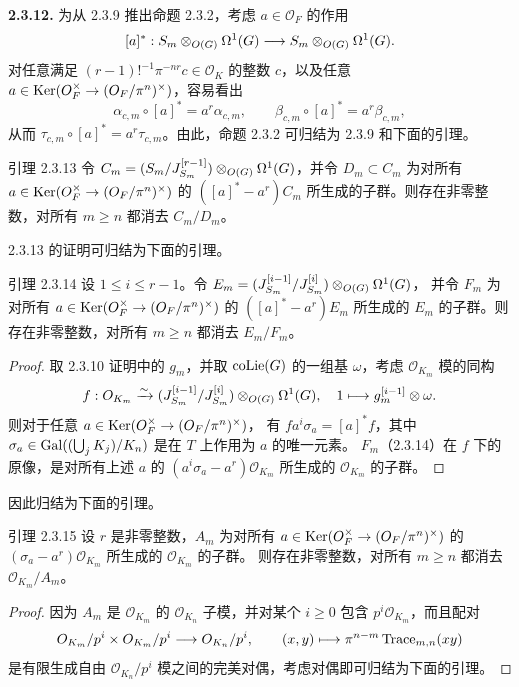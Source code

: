 \noindent\textbf{2.3.12.} 为从 2.3.9 推出命题 2.3.2，考虑 $a\in\mathcal O_F$ 的作用
\[
[a]^*:S_m\otimes_{O(G)}\Omega^1(G)\longrightarrow S_m\otimes_{O(G)}\Omega^1(G).
\]
对任意满足 $(r-1)!^{-1}\pi^{-nr}c\in\mathcal O_K$ 的整数 $c$，以及任意
$a\in\operatorname{Ker}(O_F^\times\to(O_F/\pi^n)^\times)$，容易看出
\[
\alpha_{c,m}\circ[a]^*=a^r\alpha_{c,m},\qquad
\beta_{c,m}\circ[a]^*=a^r\beta_{c,m},
\]
从而 $\tau_{c,m}\circ[a]^*=a^r\tau_{c,m}$。由此，命题 2.3.2 可归结为 2.3.9 和下面的引理。
\begin{statement}{引理 2.3.13}
令 $C_m=(S_m/J_{S_m}^{[r-1]})\otimes_{O(G)}\Omega^1(G)$，并令 $D_m\subset C_m$
为对所有 $a\in\operatorname{Ker}(O_F^\times\to(O_F/\pi^n)^\times)$ 的
$([a]^*-a^r)C_m$ 所生成的子群。则存在非零整数，对所有 $m\geq n$ 都消去 $C_m/D_m$。
\end{statement}
2.3.13 的证明可归结为下面的引理。
\begin{statement}{引理 2.3.14}
设 $1\leq i\leq r-1$。令 $E_m=(J_{S_m}^{[i-1]}/J_{S_m}^{[i]})\otimes_{O(G)}\Omega^1(G)$，
并令 $F_m$ 为对所有 $a\in\operatorname{Ker}(O_F^\times\to(O_F/\pi^n)^\times)$ 的
$([a]^*-a^r)E_m$ 所生成的 $E_m$ 的子群。则存在非零整数，对所有 $m\geq n$ 都消去 $E_m/F_m$。
\end{statement}
\begin{proof}
取 2.3.10 证明中的 $g_m$，并取 $\operatorname{coLie}(G)$ 的一组基 $\omega$，考虑
$\mathcal O_{K_m}$ 模的同构
\[
f:O_{K_m}\xrightarrow{\sim}
(J_{S_m}^{[i-1]}/J_{S_m}^{[i]})\otimes_{O(G)}\Omega^1(G),
\quad1\longmapsto g_m^{[i-1]}\otimes\omega.
\]
则对于任意 $a\in\operatorname{Ker}(O_F^\times\to(O_F/\pi^n)^\times)$，
有 $fa^i\sigma_a=[a]^*f$，其中
$\sigma_a\in\operatorname{Gal}((\bigcup_jK_j)/K_n)$ 是在 $T$ 上作用为 $a$ 的唯一元素。
$F_m$（2.3.14）在 $f$ 下的原像，是对所有上述 $a$ 的
$(a^i\sigma_a-a^r)\mathcal O_{K_m}$ 所生成的 $\mathcal O_{K_m}$ 的子群。
\end{proof}
因此归结为下面的引理。
\begin{statement}{引理 2.3.15}
设 $r$ 是非零整数，$A_m$ 为对所有
$a\in\operatorname{Ker}(O_F^\times\to(O_F/\pi^n)^\times)$ 的
$(\sigma_a-a^r)\mathcal O_{K_m}$ 所生成的 $\mathcal O_{K_m}$ 的子群。
则存在非零整数，对所有 $m\geq n$ 都消去 $\mathcal O_{K_m}/A_m$。
\end{statement}
\begin{proof}
因为 $A_m$ 是 $\mathcal O_{K_m}$ 的 $\mathcal O_{K_n}$ 子模，并对某个 $i\geq0$
包含 $p^i\mathcal O_{K_m}$，而且配对
\[
O_{K_m}/p^i\times O_{K_m}/p^i\longrightarrow O_{K_n}/p^i,
\qquad(x,y)\longmapsto\pi^{n-m}\operatorname{Trace}_{m,n}(xy)
\]
是有限生成自由 $\mathcal O_{K_n}/p^i$ 模之间的完美对偶，考虑对偶即可归结为下面的引理。
\end{proof}
